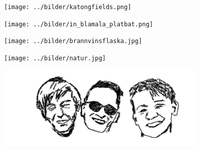 %




\begin{intersong}
	\begin{center}
		\vspace{20mm}
		\texttt{[image: ../bilder/katongfields.png]} 
	\end{center}
\end{intersong}


\begin{intersong}
	\begin{center}
		\vspace{20mm}
\texttt{[image: ../bilder/in\_blamala\_platbat.png]} 
\end{center}
\end{intersong}


\sclearpage

\begin{intersong}
\begin{center}
\texttt{[image: ../bilder/brannvinsflaska.jpg]} 
\end{center}
\end{intersong}
\sclearpage




\begin{intersong}
\begin{center}
\texttt{[image: ../bilder/natur.jpg]} 
\end{center}
\end{intersong}
\sclearpage

\sclearpage

\begin{intersong}
	\begin{center}
		\includegraphics[width=0.75\textwidth]{../bilder/fardigabilder/CamillasFardigaBilder/humorgruppenKAJ.png} 
	\end{center}
\end{intersong}

\sclearpage

%